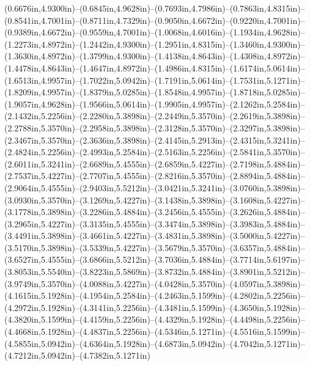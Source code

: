 (0.6676in,4.9300in)--(0.6845in,4.9628in)--(0.7693in,4.7986in)--(0.7863in,4.8315in)--(0.8541in,4.7001in)--(0.8711in,4.7329in)--(0.9050in,4.6672in)--(0.9220in,4.7001in)--(0.9389in,4.6672in)--(0.9559in,4.7001in)--(1.0068in,4.6016in)--(1.1934in,4.9628in)--(1.2273in,4.8972in)--(1.2442in,4.9300in)--(1.2951in,4.8315in)--(1.3460in,4.9300in)--(1.3630in,4.8972in)--(1.3799in,4.9300in)--(1.4138in,4.8643in)--(1.4308in,4.8972in)--(1.4478in,4.8643in)--(1.4647in,4.8972in)--(1.4986in,4.8315in)--(1.6174in,5.0614in)--(1.6513in,4.9957in)--(1.7022in,5.0942in)--(1.7191in,5.0614in)--(1.7531in,5.1271in)--(1.8209in,4.9957in)--(1.8379in,5.0285in)--(1.8548in,4.9957in)--(1.8718in,5.0285in)--(1.9057in,4.9628in)--(1.9566in,5.0614in)--(1.9905in,4.9957in)--(2.1262in,5.2584in)--(2.1432in,5.2256in)--(2.2280in,5.3898in)--(2.2449in,5.3570in)--(2.2619in,5.3898in)--(2.2788in,5.3570in)--(2.2958in,5.3898in)--(2.3128in,5.3570in)--(2.3297in,5.3898in)--(2.3467in,5.3570in)--(2.3636in,5.3898in)--(2.4145in,5.2913in)--(2.4315in,5.3241in)--(2.4824in,5.2256in)--(2.4993in,5.2584in)--(2.5163in,5.2256in)--(2.5841in,5.3570in)--(2.6011in,5.3241in)--(2.6689in,5.4555in)--(2.6859in,5.4227in)--(2.7198in,5.4884in)--(2.7537in,5.4227in)--(2.7707in,5.4555in)--(2.8216in,5.3570in)--(2.8894in,5.4884in)--(2.9064in,5.4555in)--(2.9403in,5.5212in)--(3.0421in,5.3241in)--(3.0760in,5.3898in)--(3.0930in,5.3570in)--(3.1269in,5.4227in)--(3.1438in,5.3898in)--(3.1608in,5.4227in)--(3.1778in,5.3898in)--(3.2286in,5.4884in)--(3.2456in,5.4555in)--(3.2626in,5.4884in)--(3.2965in,5.4227in)--(3.3135in,5.4555in)--(3.3474in,5.3898in)--(3.3983in,5.4884in)--(3.4491in,5.3898in)--(3.4661in,5.4227in)--(3.4831in,5.3898in)--(3.5000in,5.4227in)--(3.5170in,5.3898in)--(3.5339in,5.4227in)--(3.5679in,5.3570in)--(3.6357in,5.4884in)--(3.6527in,5.4555in)--(3.6866in,5.5212in)--(3.7036in,5.4884in)--(3.7714in,5.6197in)--(3.8053in,5.5540in)--(3.8223in,5.5869in)--(3.8732in,5.4884in)--(3.8901in,5.5212in)--(3.9749in,5.3570in)--(4.0088in,5.4227in)--(4.0428in,5.3570in)--(4.0597in,5.3898in)--(4.1615in,5.1928in)--(4.1954in,5.2584in)--(4.2463in,5.1599in)--(4.2802in,5.2256in)--(4.2972in,5.1928in)--(4.3141in,5.2256in)--(4.3481in,5.1599in)--(4.3650in,5.1928in)--(4.3820in,5.1599in)--(4.4159in,5.2256in)--(4.4329in,5.1928in)--(4.4498in,5.2256in)--(4.4668in,5.1928in)--(4.4837in,5.2256in)--(4.5346in,5.1271in)--(4.5516in,5.1599in)--(4.5855in,5.0942in)--(4.6364in,5.1928in)--(4.6873in,5.0942in)--(4.7042in,5.1271in)--(4.7212in,5.0942in)--(4.7382in,5.1271in) 